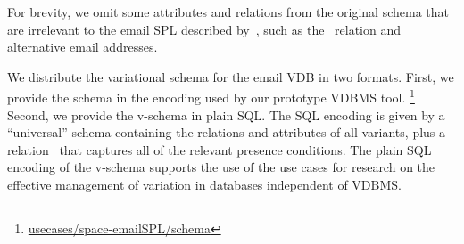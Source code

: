 %
For brevity, we omit some attributes and relations from the original schema
that are irrelevant to the email SPL described by~\citet{Hall05},
such as the \ relation and alternative email addresses. 
%

We distribute the variational schema for the email VDB in two formats.
First, we provide the schema in the encoding used by our prototype VDBMS tool.%
\footnote{\href{https://github.com/lambda-land/VDBMS/blob/master/usecases/space-emailSPL/schema/EnronSchema.hs}{usecases/space-emailSPL/schema}}
%
Second, 
we provide the v-schema in plain SQL.
%
The SQL encoding is given by a ``universal'' schema containing the relations and
attributes of all variants, plus a relation
\vdbpc\ that captures all of the relevant presence conditions.
%
%
The plain SQL encoding of the v-schema supports the use
of the use cases for research on the effective management of variation in
databases independent of VDBMS.

